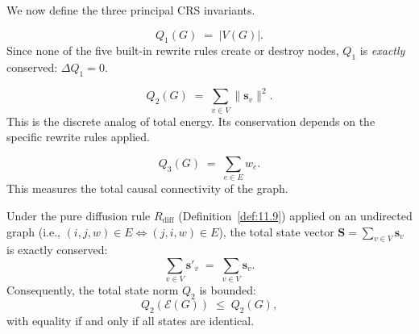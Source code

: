 We now define the three principal CRS invariants.

\begin{definition}
\label{def:11.28}
\[
  Q_1(G) \;=\; |V(G)|.
\]
Since none of the five built-in rewrite rules create or destroy nodes,
$Q_1$ is \emph{exactly} conserved: $\Delta Q_1 = 0$.
\end{definition}

\begin{definition}
\label{def:11.29}
\begin{equation}
\label{eq:11.total_norm}
  Q_2(G) \;=\;
  \sum_{v \in V} \|\mathbf{s}_v\|^2.
\end{equation}
This is the discrete analog of total energy.  Its conservation
depends on the specific rewrite rules applied.
\end{definition}

\begin{definition}
\label{def:11.30}
\begin{equation}
\label{eq:11.total_weight}
  Q_3(G) \;=\;
  \sum_{e \in E} w_e.
\end{equation}
This measures the total causal connectivity of the graph.
\end{definition}

\begin{theorem}
\label{thm:11.8}
Under the pure diffusion rule $R_{\mathrm{diff}}$
(Definition~\ref{def:11.9}) applied on an undirected graph (i.e.,
$(i,j,w) \in E \Leftrightarrow (j,i,w) \in E$), the total state
vector $\mathbf{S} = \sum_{v \in V} \mathbf{s}_v$ is exactly
conserved:
\[
  \sum_{v \in V} \mathbf{s}'_v \;=\; \sum_{v \in V} \mathbf{s}_v.
\]
Consequently, the total state norm $Q_2$ is bounded:
\[
  Q_2(\mathcal{E}(G)) \;\leq\; Q_2(G),
\]
with equality if and only if all states are identical.
\end{theorem}

